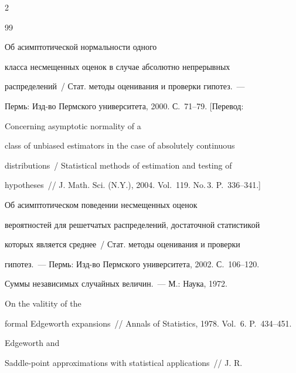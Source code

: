 \begin{multicols}{2}
{{\begin{thebibliography}{99}


Об асимптотической нормальности одного


класса несмещенных оценок в случае абсолютно непрерывных


распределений~/ Стат. методы оценивания и проверки гипотез.~---


 Пермь: Изд-во Пермского университета, 2000. С.~71--79. [Перевод:


 Concerning asymptotic normality of a


class of unbiased estimators in the case of absolutely continuous


distributions~/ Statistical methods of estimation and testing of


hypotheses~// J. Math. Sci. (N.Y.), 2004. Vol.~119. No.\,3. P.~336--341.]











Об асимптотическом поведении несмещенных оценок


вероятностей для решетчатых распределений, достаточной статистикой


которых является среднее~/ Стат. методы оценивания и проверки


гипотез.~--- Пермь: Изд-во Пермского университета, 2002. С.~106--120.











Суммы независимых случайных величин.~--- М.: Наука, 1972.








On the valitity of the


formal Edgeworth expansions~// Annals of Statistics, 1978. Vol.~6. P.~434--451.








Edgeworth and


Saddle-point approximations with statistical applications~// J. R.



\end{thebibliography}}}
\end{multicols}
